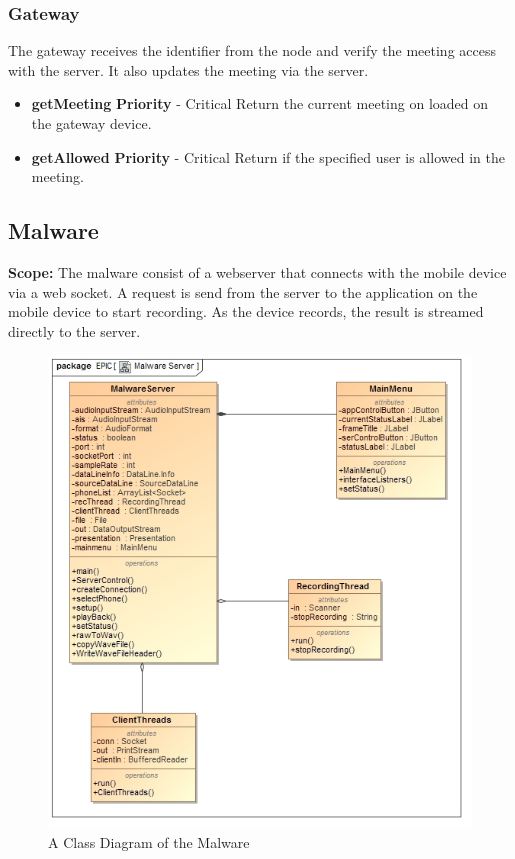 \documentclass{article}
\begin{document}
		\subsubsection{Gateway} The gateway receives the identifier from the node and verify the meeting access with the server. It also updates the meeting via the server.
		\begin{itemize}
			\item \textbf{getMeeting}
				\newline\textbf{ Priority } - Critical
				\newline Return the current meeting on loaded on the gateway device.
			\item \textbf{getAllowed}
				\newline\textbf{ Priority } - Critical
				\newline Return if the specified user is allowed in the meeting.
			

		\end{itemize}



\newpage
		
		\subsection{Malware}
		\textbf{Scope: } The malware consist of a webserver that connects with the mobile device via a web socket. A request is send from the server to the application on the mobile device to start recording. As the device records, the result is streamed directly to the server.
		\begin{figure}[H]
 			 \centering
			  \includegraphics[width=12cm]{MalwareClass}
		 	 \caption{A Class Diagram of the Malware}
		\end{figure}
\end{document}
